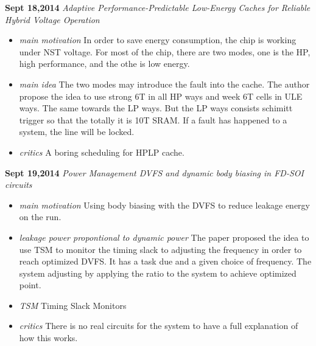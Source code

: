 \documentclass[]{article}
\begin{document}
\noindent \textbf{Sept 18,2014}
\textit{Adaptive Performance-Predictable Low-Energy Caches for Reliable Hybrid Voltage Operation}
\indent     \begin{itemize}
            \item \textit{main motivation} In order to save energy consumption, the chip is working under NST voltage.
            For most of the chip, there are two modes, one is the HP, high performance, and the othe is low energy.

            \item \textit{main idea} The two modes may introduce the fault into the cache. The author propose the idea to
            use strong 6T in all HP ways and week 6T cells in ULE ways. The same towards the LP ways. But the LP ways 
            consists schimitt trigger so that the totally it is 10T SRAM. If a fault has happened to a system, the line 
            will be locked. 

            \item \textit{critics} A boring scheduling for HPLP cache.
        \end{itemize}

\noindent \textbf{Sept 19,2014}
\textit{Power Management DVFS and dynamic body biasing in FD-SOI circuits}
\indent     \begin{itemize}
            \item \textit{main motivation} Using body biasing with the DVFS to reduce leakage energy on the run.
            
            \item \textit{leakage power propontional to dynamic power} The paper proposed the idea to use TSM to 
            monitor the timing slack to adjusting the frequency in order to reach optimized DVFS. It has a task
            due and a given choice of frequency. The system adjusting by applying the ratio to the system to
            achieve optimized point.

            \item \textit{TSM} Timing Slack Monitors

            \item \textit{critics} There is no real circuits for the system to have a full explanation of how this
            works.
        \end{itemize}
\end{document}
